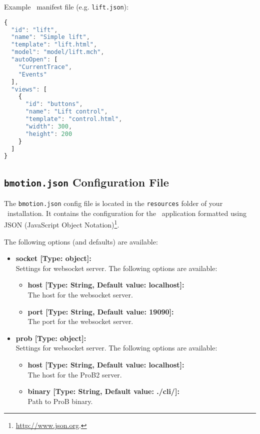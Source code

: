 Example \bms\ manifest file (e.g. \texttt{lift.json}):

\begin{lstlisting}[language=JavaScript]
{
  "id": "lift",
  "name": "Simple lift",
  "template": "lift.html",
  "model": "model/lift.mch",
  "autoOpen": [
    "CurrentTrace",
    "Events"
  ],
  "views": [
    {
      "id": "buttons",
      "name": "Lift control",
      "template": "control.html",
      "width": 300,
      "height": 200
    }
  ]
}
\end{lstlisting}

\subsection{\texttt{bmotion.json} Configuration File}
\label{sec:configfile}

The \texttt{bmotion.json} config file is located in the \texttt{resources} folder of your \bms\ installation.
It contains the configuration for the \bms\ application formatted using JSON (JavaScript Object Notation)\footnote{\url{http://www.json.org}.}.


The following options (and defaults) are available:

\begin{itemize}

	\item[] \textbf{socket [Type: object]:}\\ Settings for websocket server. The following options are available:
	\begin{itemize}
		\item[] \textbf{host [Type: String, Default value: localhost]:}\\ The host for the websocket server.
		\item[] \textbf{port [Type: String, Default value: 19090]:}\\ The port for the websocket server.
	\end{itemize}

	\item[] \textbf{prob [Type: object]:}\\ Settings for websocket server. The following options are available:
	\begin{itemize}
		\item[] \textbf{host [Type: String, Default value: localhost]:}\\ The host for the ProB2 server.
		\item[] \textbf{binary [Type: String, Default value: ./cli/]:}\\ Path to ProB binary.
	\end{itemize}

\end{itemize}